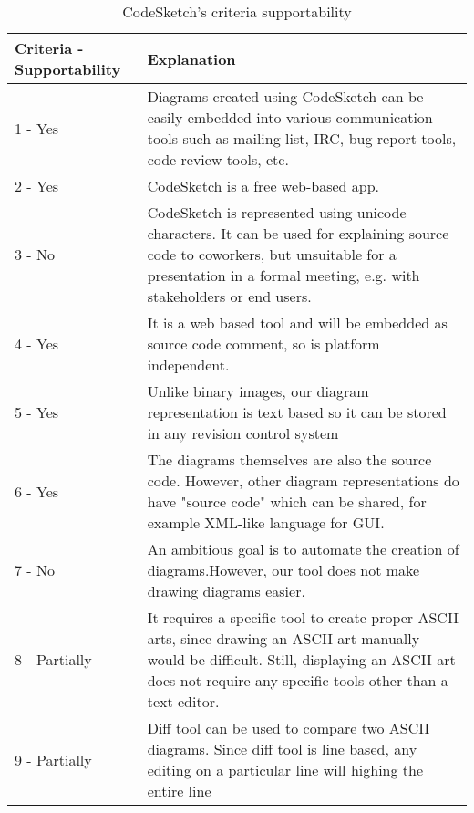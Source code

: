 \documentclass{sig-alternate}
\begin{document}
\begin{table}[h]
\small
\begin{tabular}{|p{55px}|p{170px}|}
\hline
\textbf{Criteria - Supportability} & \textbf{Explanation} \\ \hline

1 - Yes & 
Diagrams created using CodeSketch can be easily embedded into various communication tools such as mailing list, IRC, bug report tools, code review tools, etc. 
\\ \hline

2 - Yes & 
CodeSketch is a free web-based app. 
\\ \hline

3 - No & 
CodeSketch is represented using unicode characters. It can be used for explaining source code to coworkers, but unsuitable for a presentation in a formal meeting, e.g. with stakeholders or end users. 
\\ \hline

4 - Yes & 
It is a web based tool and will be embedded as source code comment, so is platform independent. 
\\ \hline

5 - Yes & 
Unlike binary images, our diagram representation is text based so it can be stored in any revision control system  
\\ \hline

6 - Yes & 
The diagrams themselves are also the source code. However, other diagram representations do have "source code" which can be shared, for example XML-like language for GUI. 
\\ \hline

7 - No & 
An ambitious goal is to automate the creation of diagrams.However, our tool does not make drawing diagrams easier. 
\\ \hline

8 - Partially & 
It requires a specific tool to create proper ASCII arts, since drawing an ASCII art manually would be difficult. Still, displaying an ASCII art does not require any specific tools other than a text editor. \\ \hline

9 - Partially & 
Diff tool can be used to compare two ASCII diagrams. Since diff tool is line based, any editing on a particular line will highing the entire line 
\\ \hline

\end{tabular}
\caption {CodeSketch's criteria supportability}
\label{codesketch_criteria_supportability}
\end{table}
\end{document}
